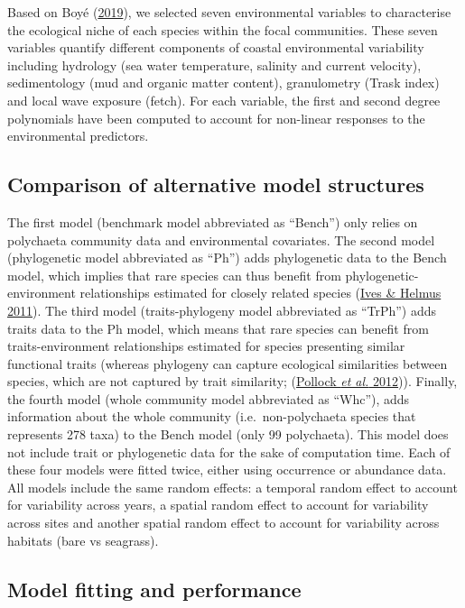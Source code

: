 \documentclass[9pt,biorxiv,doublespacing,lineno,endfloat]{lapreprint}
\begin{document}
Based on Boyé (\protect\hyperlink{ref-Boye_2019b}{2019}), we selected
seven environmental variables to characterise the ecological niche of
each species within the focal communities. These seven variables
quantify different components of coastal environmental variability
including hydrology (sea water temperature, salinity and current
velocity), sedimentology (mud and organic matter content), granulometry
(Trask index) and local wave exposure (fetch). For each variable, the
first and second degree polynomials have been computed to account for
non-linear responses to the environmental predictors.

\hypertarget{comparison-of-alternative-model-structures}{%
\subsection{Comparison of alternative model
structures}\label{comparison-of-alternative-model-structures}}

The first model (benchmark model abbreviated as ``Bench'') only relies
on polychaeta community data and environmental covariates. The second
model (phylogenetic model abbreviated as ``Ph'') adds phylogenetic data
to the Bench model, which implies that rare species can thus benefit
from phylogenetic-environment relationships estimated for closely
related species (\protect\hyperlink{ref-Ives_2011}{Ives \& Helmus
2011}). The third model (traits-phylogeny model abbreviated as ``TrPh'')
adds traits data to the Ph model, which means that rare species can
benefit from traits-environment relationships estimated for species
presenting similar functional traits (whereas phylogeny can capture
ecological similarities between species, which are not captured by trait
similarity; (\protect\hyperlink{ref-Pollock_2012}{Pollock \emph{et al.}
2012})). Finally, the fourth model (whole community model abbreviated as
``Whc''), adds information about the whole community
(i.e.~non-polychaeta species that represents 278 taxa) to the Bench
model (only 99 polychaeta). This model does not include trait or
phylogenetic data for the sake of computation time. Each of these four
models were fitted twice, either using occurrence or abundance data. All
models include the same random effects: a temporal random effect to
account for variability across years, a spatial random effect to account
for variability across sites and another spatial random effect to
account for variability across habitats (bare vs seagrass).

\hypertarget{model-fitting-and-performance}{%
\subsection{Model fitting and
performance}\label{model-fitting-and-performance}}
\end{document}
